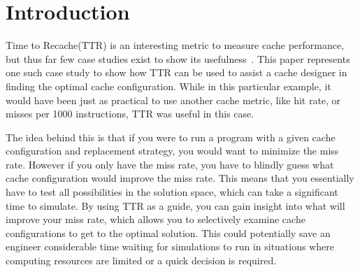 \section{Introduction}

Time to Recache(TTR) is an interesting metric to measure cache performance, but thus far few case studies exist to show its usefulness~\cite{spjutpugsley11,carterkorbel13}. This paper represents one such case study to show how TTR can be used to assist a cache designer in finding the optimal cache configuration. While in this particular example, it would have been just as practical to use another cache metric, like hit rate, or misses per 1000 instructions, TTR was useful in this case.

The idea behind this is that if you were to run a program with a given cache configuration and replacement strategy, you would want to minimize the miss rate. 
However if you only have the miss rate, you have to blindly guess what cache configuration would improve the miss rate. 
This means that you essentially have to test all possibilities in the solution space, which can take a significant time to simulate. 
By using TTR as a guide, you can gain insight into what will improve your miss rate, which allows you to selectively examine cache configurations to get to the optimal solution.
This could potentially save an engineer considerable time waiting for simulations to run in situations where computing resources are limited or a quick decision is required.




